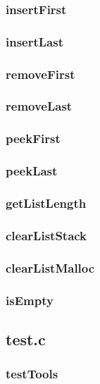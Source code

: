 \documentclass[a4paper, 12pt, titlepage]{article}
\begin{document}
\subsubsection{insertFirst}

\subsubsection{insertLast}

\subsubsection{removeFirst}

\subsubsection{removeLast}

\subsubsection{peekFirst}

\subsubsection{peekLast}

\subsubsection{getListLength}

\subsubsection{clearListStack}

\subsubsection{clearListMalloc}

\subsubsection{isEmpty}

\subsection{test.c}
\subsubsection{testTools}
\end{document}
